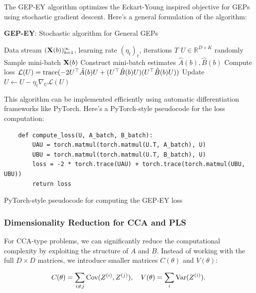 The GEP-EY algorithm optimizes the Eckart-Young inspired objective for GEPs using stochastic gradient descent. Here's a general formulation of the algorithm:

\begin{algorithm}
\caption{\textbf{GEP-EY}: Stochastic algorithm for General GEPs}
\label{alg:general_gep}
\begin{algorithmic}
 Data stream $(\mathbf{X}(b))_{b=1}^\infty$, learning rate $(\eta_t)_t$, iterations $T$
 $U \in \mathbb{R}^{D \times K}$ randomly
\STATE Sample mini-batch $\mathbf{X}(b)$
\STATE Construct mini-batch estimates $\hat{A}(b), \hat{B}(b)$
\STATE Compute loss $\mathcal{L}(U) = \operatorname{trace}(-2U^\top \hat{A}(b) U + (U^\top \hat{B}(b) U)(U^\top \hat{B}(b) U))$
\STATE Update $U \leftarrow U - \eta_t \nabla_U \mathcal{L}(U)$
\ENDFOR
\end{algorithmic}
\end{algorithm}

This algorithm can be implemented efficiently using automatic differentiation frameworks like PyTorch. Here's a PyTorch-style pseudocode for the loss computation:

\begin{listing}[ht]
    \begin{verbatim}
    def compute_loss(U, A_batch, B_batch):
        UAU = torch.matmul(torch.matmul(U.T, A_batch), U)
        UBU = torch.matmul(torch.matmul(U.T, B_batch), U)
        loss = -2 * torch.trace(UAU) + torch.trace(torch.matmul(UBU, UBU))
        return loss
    \end{verbatim}
    \caption{PyTorch-style pseudocode for computing the GEP-EY loss}
    \label{lst:gep-ey-loss}
\end{listing}

\subsubsection{Dimensionality Reduction for CCA and PLS}
For CCA-type problems, we can significantly reduce the computational complexity by exploiting the structure of $A$ and $B$. Instead of working with the full $D \times D$ matrices, we introduce smaller matrices $C(\theta)$ and $V(\theta)$:

\begin{align}\label{eq:def-C-V-matrices}
C(\theta) = \sum_{i \neq j} \mathrm{Cov}(Z^{(i)}, Z^{(j)}), \quad
V(\theta) = \sum_{i} \mathrm{Var}(Z^{(i)}).
\end{align}

